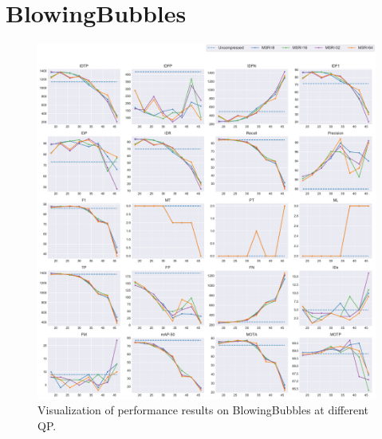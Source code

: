 
\section{BlowingBubbles}
\label{sec:appendix/BlowingBubbles_all}


\begin{figure}[!htbp]
\centering
\includegraphics[width=1.0\linewidth]{img/appendix/BlowingBubbles_all_multiplots_qp.pdf}
\caption[Visualization of performance results on BlowingBubbles at different QP]
{Visualization of performance results on BlowingBubbles at different QP.}
\label{fig:BlowingBubbles_all_qp}
\end{figure}

